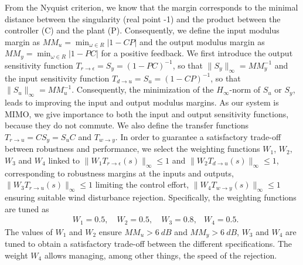 From the Nyquist criterion, we know that the margin corresponds to the minimal distance between the singularity (real point -1) and the product between the controller (C) and the plant (P). Consequently, we define the input modulus margin as $MM_{u} =\min_{\omega\in R}|1-CP|$ and the output modulus margin as $MM_{y} =\min_{\omega\in R}| 1-PC |$ for a positive feedback. We first introduce the output sensitivity function  $T_{r \rightarrow \epsilon}=S_{y}=(1-PC)^{-1}$, so that $\lVert S_{y} \rVert_{\infty}=MM_{y}^{-1}$ and the input sensitivity function $T_{d \rightarrow u}=S_{u}=(1-CP)^{-1}$, so that $\lVert S_{u} \rVert_{\infty}=MM_{u}^{-1}$. Consequently, the minimization of the  $H_{\infty}$-norm of $S_{u}$ or $S_{y}$, leads to improving the input and output modulus margins. As our system is MIMO, we give importance to both the input and output sensitivity functions, because they do not commute. We also define the transfer functions $T_{r \rightarrow u}= CS_{y} = S_{u}C$ and $T_{w \rightarrow y}$. In order to guarantee a satisfactory trade-off between robustness and performance, we select the weighting functions $W_{1}$, $W_{2}$, $W_{3}$ and $W_{4}$ linked to $\lVert W_{1} T_{r \rightarrow \epsilon}(s)\rVert_{\infty} \leq 1 $ and $\lVert W_{2} T_{d \rightarrow u}(s)\rVert_{\infty} \leq 1 $, corresponding to robustness margins at the inputs and outputs, $\lVert W_{3} T_{r \rightarrow u}(s)\rVert_{\infty} \leq 1 $ limiting the control effort, $\lVert W_{4} T_{w \rightarrow y}(s)\rVert_{\infty} \leq 1 $ ensuring suitable wind disturbance rejection. Specifically, the weighting functions are tuned as
\begin{align} \label{eq:weight_gain}
    &W_{1} =  0.5, \quad
    W_{2} = 0.5, \quad
    W_{3} = 0.8, 
    &W_{4} = 0.5.
\end{align}
The values of $W_{1}$ and $W_{2}$ ensure $MM_{u} >  6~dB$ and $MM_{y} >  6~dB$, $ W_{3}$ and $W_{4}$ are tuned to obtain a satisfactory trade-off between the different specifications. The weight $ W_{4} $  allows managing, among other things, the speed of the rejection.

